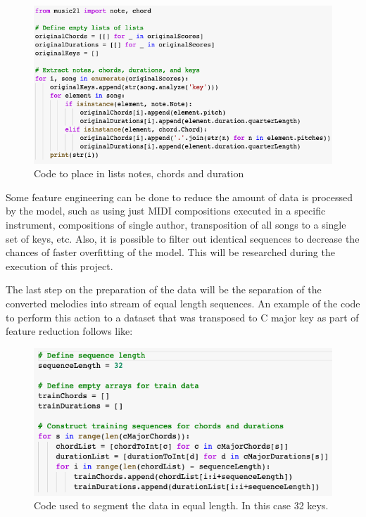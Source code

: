 \begin{figure}[h!]
  \includegraphics[width=\linewidth]{image/fig_JDF19.png}
  \caption{Code to place in lists notes, chords and duration }
\end{figure}


Some feature engineering can be done to reduce the amount of data is processed by the
model, such as using just MIDI compositions executed in a specific instrument,
compositions of single author, transposition of all songs to a single set of keys, etc.
Also, it is possible to filter out identical sequences to decrease the chances of faster
overfitting of the model. This will be researched during the execution of this project.

The last step on the preparation of the data will be the separation of the converted
melodies into stream of equal length sequences. An example of the code to perform this
action to a dataset that was transposed to C major key as part of feature reduction
follows like:

\begin{figure}[h!]
  \includegraphics[width=\linewidth]{image/fig_JDF20.png}
  \caption{Code used to segment the data in equal length. In this case 32 keys.}
\end{figure}

